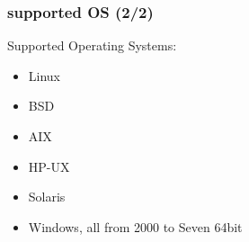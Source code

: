 \begin{frame}
    \frametitle{supported OS (2/2)}
    Supported Operating Systems:

    \begin{itemize}
        \item<2-> Linux
        \item<3-> BSD
        \item<4-> AIX
        \item<5-> HP-UX
        \item<6-> Solaris
        \item<7-> Windows, all from 2000 to Seven 64bit
    \end{itemize}




\end{frame}
